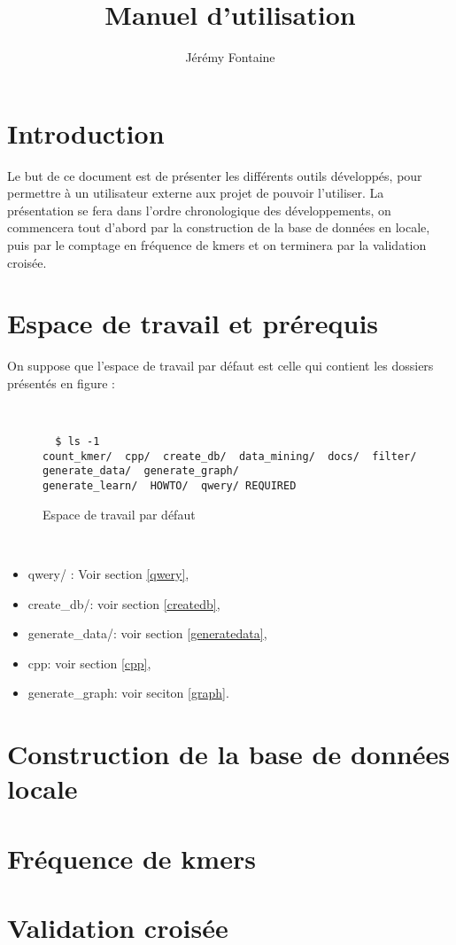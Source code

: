 \documentclass[10pt,a4paper]{article}
\title{Manuel d'utilisation}
\author{Jérémy Fontaine}
\begin{document}
\newpage
\tableofcontents
\newpage
\listoffigures

\newpage
\section{Introduction}
\vspace{10em}
Le but de ce document est de présenter les différents outils développés, pour permettre à un utilisateur externe aux projet de 
pouvoir l'utiliser. La présentation se fera dans l'ordre chronologique des développements, on commencera tout d'abord par la
construction de la base de données en locale, puis par le comptage en fréquence de kmers et on terminera par la validation croisée.
\newpage

\section{Espace de travail et prérequis}
On suppose que l'espace de travail par défaut est celle qui contient les dossiers présentés en figure  :

~\\
\begin{figure}[H]

\begin{center}
\begin{verbatim}
  $ ls -1
count_kmer/  cpp/  create_db/  data_mining/  docs/  filter/ generate_data/  generate_graph/  
generate_learn/  HOWTO/  qwery/ REQUIRED
\end{verbatim}


\end{center}
\caption{\label{ws}Espace de travail par défaut}
\end{figure}
~\\

\begin{itemize}
  \item qwery/ : Voir section \ref{qwery},
  \item create\_db/: voir section \ref{createdb},
  \item generate\_data/: voir section \ref{generatedata},
  \item cpp: voir section \ref{cpp},
  \item generate\_graph: voir seciton \ref{graph}.
\end{itemize}
\newpage

\section{Construction de la base de données locale}

\newpage
\section{Fréquence de kmers}


\newpage
\section{Validation croisée}

\end{document}
